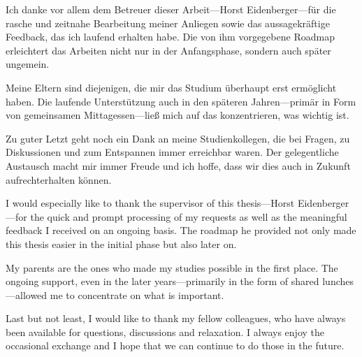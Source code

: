 \documentclass[final]{vutinfth} %
\begin{document}
\frontmatter %

\addstatementpage

\begin{danksagung*}
  Ich danke vor allem dem Betreuer dieser Arbeit—Horst Eidenberger—für
  die rasche und zeitnahe Bearbeitung meiner Anliegen sowie das
  aussagekräftige Feedback, das ich laufend erhalten habe. Die von ihm
  vorgegebene Roadmap erleichtert das Arbeiten nicht nur in der
  Anfangsphase, sondern auch später ungemein.

  Meine Eltern sind diejenigen, die mir das Studium überhaupt erst
  ermöglicht haben. Die laufende Unterstützung auch in den späteren
  Jahren—primär in Form von gemeinsamen Mittagessen—ließ mich auf das
  konzentrieren, was wichtig ist.

  Zu guter Letzt geht noch ein Dank an meine Studienkollegen, die bei
  Fragen, zu Diskussionen und zum Entspannen immer erreichbar
  waren. Der gelegentliche Austausch macht mir immer Freude und ich
  hoffe, dass wir dies auch in Zukunft aufrechterhalten können.
\end{danksagung*}

\begin{acknowledgements*}
  I would especially like to thank the supervisor of this thesis—Horst
  Eidenberger—for the quick and prompt processing of my requests as
  well as the meaningful feedback I received on an ongoing basis. The
  roadmap he provided not only made this thesis easier in the initial
  phase but also later on.

  My parents are the ones who made my studies possible in the first
  place. The ongoing support, even in the later years—primarily in
  the form of shared lunches—allowed me to concentrate on what is
  important.

  Last but not least, I would like to thank my fellow colleagues, who
  have always been available for questions, discussions and
  relaxation. I always enjoy the occasional exchange and I hope that
  we can continue to do those in the future.
\end{acknowledgements*}
\end{document}
